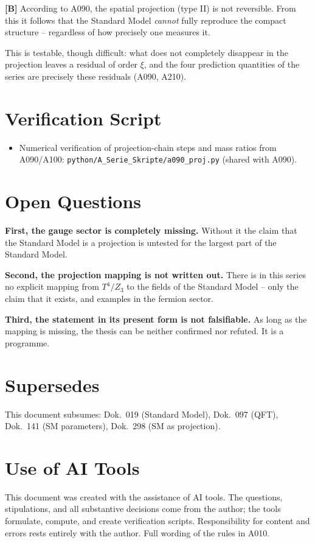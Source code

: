 \textbf{[B]} According to A090, the spatial projection (type II) is not
reversible. From this it follows that the Standard Model \emph{cannot} fully
reproduce the compact structure -- regardless of how precisely one measures it.

This is testable, though difficult: what does not completely disappear in the
projection leaves a residual of order $\xi$, and the four prediction quantities
of the series are precisely these residuals (A090, A210).

\section{Verification Script}

\begin{itemize}[leftmargin=2em,itemsep=2pt,topsep=2pt]
  \item Numerical verification of projection-chain steps and mass ratios from
    A090/A100:
    \texttt{python/A\_Serie\_Skripte/a090\_proj.py} (shared with A090).
\end{itemize}

\section{Open Questions}

\textbf{First, the gauge sector is completely missing.} Without it the claim that
the Standard Model is a projection is untested for the largest part of the
Standard Model.

\textbf{Second, the projection mapping is not written out.} There is in this
series no explicit mapping from $T^4/Z_3$ to the fields of the Standard Model --
only the claim that it exists, and examples in the fermion sector.

\textbf{Third, the statement in its present form is not falsifiable.} As long as
the mapping is missing, the thesis can be neither confirmed nor refuted. It is a
programme.

\section{Supersedes}

This document subsumes: Dok.~019 (Standard Model), Dok.~097 (QFT), Dok.~141
(SM parameters), Dok.~298 (SM as projection).

\section{Use of AI Tools}

This document was created with the assistance of AI tools. The questions,
stipulations, and all substantive decisions come from the author; the tools
formulate, compute, and create verification scripts.
Responsibility for content and errors rests entirely with the author.
Full wording of the rules in A010.
